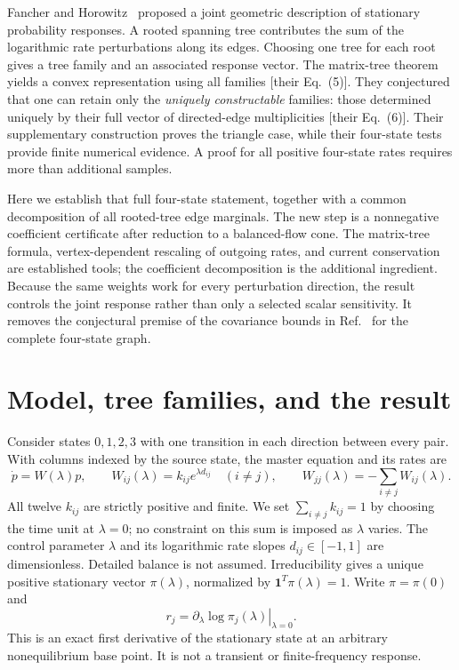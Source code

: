 \documentclass[11pt,a4paper]{article}
\newcommand{\one}{\mathbf 1}
\begin{document}
Fancher and Horowitz~\cite{FancherHorowitz2026} proposed a joint geometric
description of stationary probability responses. A rooted spanning tree
contributes the sum of the logarithmic rate perturbations along its
edges. Choosing one tree for each root gives a tree family and an
associated response vector. The matrix-tree theorem yields a convex
representation using all families [their Eq.~(5)]. They conjectured
that one can retain only the \emph{uniquely constructable} families:
those determined uniquely by their full vector of directed-edge
multiplicities [their Eq.~(6)]. Their supplementary construction proves
the triangle case, while their four-state tests provide finite numerical
evidence. A proof for all positive four-state rates requires more than
additional samples.

Here we establish that full four-state statement, together with a common
decomposition of all rooted-tree edge marginals. The new step is a
nonnegative coefficient certificate after reduction to a balanced-flow
cone. The matrix-tree formula, vertex-dependent rescaling of outgoing
rates, and current conservation are established tools; the coefficient
decomposition is the additional ingredient. Because the same weights
work for every perturbation direction, the result controls the joint
response rather than only a selected scalar sensitivity. It removes the
conjectural premise of the covariance bounds in
Ref.~\cite{FancherHorowitz2026} for the complete four-state graph.

\section{Model, tree families, and the result}
\label{sec:model}

Consider states $0,1,2,3$ with one transition in each direction between
every pair. With columns indexed by the source state, the master
equation and its rates are
\begin{equation}
 \dot p=W(\lambda)p,\qquad
 W_{ij}(\lambda)=k_{ij}e^{\lambda d_{ij}}\quad(i\ne j),\qquad
 W_{jj}(\lambda)=-\sum_{i\ne j}W_{ij}(\lambda).
 \label{eq:model}
\end{equation}
All twelve $k_{ij}$ are strictly positive and finite. We set
$\sum_{i\ne j}k_{ij}=1$ by choosing the time unit at $\lambda=0$; no
constraint on this sum is imposed as $\lambda$ varies. The control
parameter $\lambda$ and its logarithmic rate slopes $d_{ij}\in[-1,1]$
are dimensionless. Detailed balance is not assumed. Irreducibility
gives a unique positive stationary vector $\pi(\lambda)$, normalized
by $\one^T\pi(\lambda)=1$. Write $\pi=\pi(0)$ and
\begin{equation}
 r_j=\left.\partial_\lambda\log\pi_j(\lambda)\right|_{\lambda=0}.
 \label{eq:r}
\end{equation}
This is an exact first derivative of the stationary state at an arbitrary
nonequilibrium base point. It is not a transient or finite-frequency response.
\end{document}
